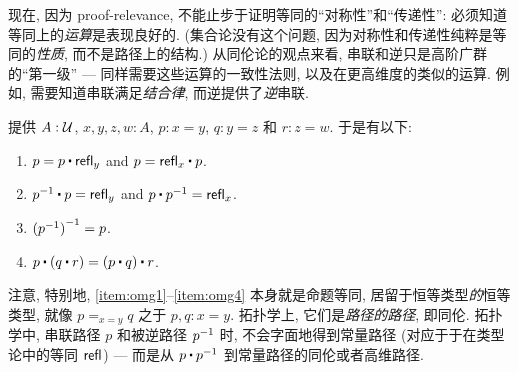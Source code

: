 现在, 因为 proof-relevance, 不能止步于证明等同的``对称性''和``传递性'': 必须知道等同上的\emph{运算}是表现良好的.
(集合论没有这个问题, 因为对称性和传递性纯粹是等同的\emph{性质}, 而不是路径上的结构.)
从同伦论的观点来看, 串联和逆只是高阶广群的``第一级'' --- 同样需要这些运算的一致性法则, 以及在更高维度的类似的运算.
例如, 需要知道串联满足\emph{结合律}, 而逆提供了\emph{逆}串联.

\begin{lem}
    \label{thm:omg}%
    提供 $A:\mathcal{U}$, $x,y,z,w:A$, $p:x= y$, $q:y = z$ 和 $r:z=w$.
    于是有以下:
    \begin{enumerate}
        \item $p= p\ct \refl{y}$ and $p = \refl{x} \ct p$.\label{item:omg1}
        \item $\opp{p}\ct p= \refl{y}$ and $p\ct \opp{p}= \refl{x}$.\label{item:omg2}
        \item $\mathord{{(\mathord{{p}^{-1}})}^{-1}}= p$.\label{item:omg3}
        \item $p\ct (q\ct r)= (p\ct q)\ct r$.\label{item:omg4}
    \end{enumerate}
\end{lem}

注意, 特别地, \ref{item:omg1}--\ref{item:omg4} 本身就是命题等同, 居留于恒等类型\emph{的}恒等类型, 就像 $p=_{x=y}q$ 之于 $p,q:x=y$.
拓扑学上, 它们是\emph{路径的路径}, 即同伦.
拓扑学中, 串联路径 $p$ 和被逆路径 $\mathord{{p}^{-1}}$ 时, 不会字面地得到常量路径 (对应于于在类型论中的等同 $\mathsf{refl}_{}$) --- 而是从 $p\ct\opp p$ 到常量路径的同伦或者高维路径.

